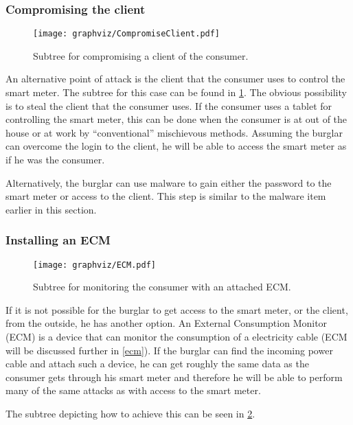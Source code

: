 \subsubsection{Compromising the client}\label{compromise:client}

\begin{figure}[H]
\center
\texttt{[image: graphviz/CompromiseClient.pdf]}
\caption{Subtree for compromising a client of the consumer.}
\label{attacktree:compromiseClient}
\end{figure}

An alternative point of attack is the client that the consumer uses to control the smart meter.
The subtree for this case can be found in \cref{attacktree:compromiseClient}.
The obvious possibility is to steal the client that the consumer uses.
If the consumer uses a tablet for controlling the smart meter, this can be done when the consumer is at out of the house or at work by ``conventional'' mischievous methods.
Assuming the burglar can overcome the login to the client, he will be able to access the smart meter as if he was the consumer.

Alternatively, the burglar can use malware to gain either the password to the smart meter or access to the client.
This step is similar to the malware item earlier in this section.



\subsubsection{Installing an ECM} \label{compromise:ecm}

\begin{figure}[H]
\center
\texttt{[image: graphviz/ECM.pdf]}
\caption{Subtree for monitoring the consumer with an attached ECM.}
\label{attacktree:ECM}
\end{figure}

If it is not possible for the burglar to get access to the smart meter, or the client, from the outside, he has another option.
An External Consumption Monitor (ECM) is a device that can monitor the consumption of a electricity cable (ECM will be discussed further in \cref{ecm}).
If the burglar can find the incoming power cable and attach such a device, he can get roughly the same data as the consumer gets through his smart meter and therefore he will be able to perform many of the same attacks as with access to the smart meter.

The subtree depicting how to achieve this can be seen in \cref{attacktree:ECM}.


